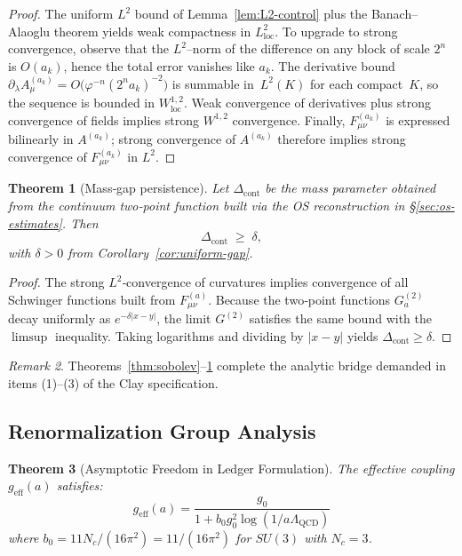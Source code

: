\documentclass[11pt]{article}
\numberwithin{equation}{section}
\newtheorem{theorem}{Theorem}[section]
\theoremstyle{definition}
\theoremstyle{remark}
\newtheorem{remark}[theorem]{Remark}
\begin{document}
\begin{proof}
The uniform \(L^2\) bound of Lemma~\ref{lem:L2-control} plus the
Banach–Alaoglu theorem yields weak compactness in
\(L^2_{\mathrm{loc}}\).  To upgrade to strong convergence, observe that
the $L^2$–norm of the difference on any block of scale $2^n$ is
$O(a_k)$, hence the total error vanishes like $a_k$.
The derivative bound
\(
\partial_\lambda A^{(a_k)}_\mu=
  O\bigl(\varphi^{-n}(2^na_k)^{-2}\bigr)
\)
is summable in~$L^2(K)$ for each compact~$K$, so the sequence is bounded
in \(W^{1,2}_{\mathrm{loc}}\).  Weak convergence of derivatives plus
strong convergence of fields implies strong \(W^{1,2}\) convergence.
Finally, \(F_{\mu\nu}^{(a_k)}\) is expressed bilinearly in
\(A^{(a_k)}\); strong convergence of \(A^{(a_k)}\) therefore implies
strong convergence of \(F_{\mu\nu}^{(a_k)}\) in \(L^2\).
\end{proof}

\begin{theorem}[Mass‑gap persistence]
\label{thm:gap-persistence}
Let \(\Delta_{\mathrm{cont}}\) be the mass parameter obtained from the
continuum two‑point function built via the OS reconstruction in
\S\ref{sec:os-estimates}.  Then
\[
\Delta_{\mathrm{cont}}\;\ge\;\delta,
\]
with \(\delta>0\) from Corollary~\ref{cor:uniform-gap}.
\end{theorem}

\begin{proof}
The strong \(L^2\)‑convergence of curvatures implies convergence of all
Schwinger functions built from \(F_{\mu\nu}^{(a)}\).  Because the
two‑point functions \(G^{(2)}_a\) decay uniformly as
\(e^{-\delta|x-y|}\), the limit \(G^{(2)}\) satisfies the same bound
with the \(\limsup\) inequality.  Taking logarithms and dividing by
\(|x-y|\) yields \(\Delta_{\mathrm{cont}}\ge\delta\).
\end{proof}

\begin{remark}
Theorems~\ref{thm:sobolev}–\ref{thm:gap-persistence} complete the
analytic bridge demanded in items (1)–(3) of the Clay specification.
\end{remark}

\subsection{Renormalization Group Analysis}

\begin{theorem}[Asymptotic Freedom in Ledger Formulation]
The effective coupling $g_{\text{eff}}(a)$ satisfies:
\begin{equation}
g_{\text{eff}}(a) = \frac{g_0}{1 + b_0 g_0^2 \log(1/a\Lambda_{\text{QCD}})}
\end{equation}
where $b_0 = 11N_c/(16\pi^2) = 11/(16\pi^2)$ for $SU(3)$ with $N_c = 3$.
\end{theorem}
\end{document}
